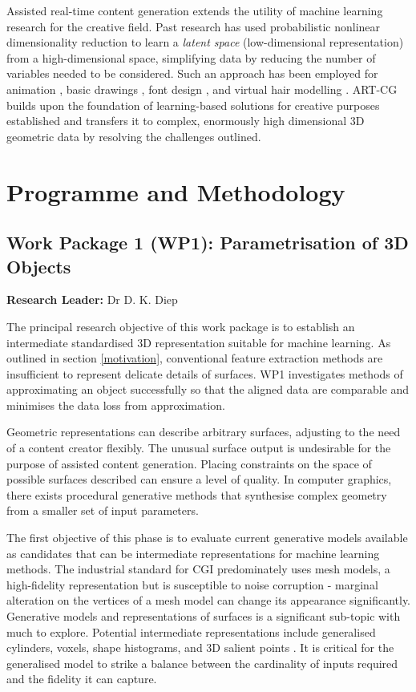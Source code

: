 \documentclass[a4paper, 11pt, onecolumn]{article} %
\numberwithin{equation}{section} %
\numberwithin{figure}{section} %
\numberwithin{table}{section} %
\begin{document}
Assisted real-time content generation extends the utility of machine learning research for the creative field. Past research has used probabilistic nonlinear dimensionality reduction to learn a \textit{latent space} (low-dimensional representation) from a high-dimensional space, simplifying data by reducing the number of variables needed to be considered. Such an approach has been employed for animation \cite{styleik}, basic drawings \cite{latentdoodle}, font design \cite{fontmanifold}, and virtual hair modelling \cite{artcg}. ART-CG builds upon the foundation of learning-based solutions for creative purposes established and transfers it to complex, enormously high dimensional 3D geometric data by resolving the challenges outlined.


\section{Programme and Methodology}
\subsection*{Work Package 1 (WP1): Parametrisation of 3D Objects}
\textbf{Research Leader:} Dr D. K. Diep\par

The principal research objective of this work package is to establish an intermediate standardised 3D representation suitable for machine learning. As outlined in section \ref{motivation}, conventional feature extraction methods are insufficient to represent delicate details of surfaces. WP1 investigates methods of approximating an object successfully so that the aligned data are comparable and minimises the data loss from approximation.

Geometric representations can describe arbitrary surfaces, adjusting to the need of a content creator flexibly. The unusual surface output is undesirable for the purpose of assisted content generation. Placing constraints on the space of possible surfaces described can ensure a level of quality. In computer graphics, there exists procedural generative methods that synthesise complex geometry from a smaller set of input parameters.

The first objective of this phase is to evaluate current generative models available as candidates that can be intermediate representations for machine learning methods. The industrial standard for CGI predominately uses mesh models, a high-fidelity representation but is susceptible to noise corruption - marginal alteration on the vertices of a mesh model can change its appearance significantly. Generative models and representations of surfaces is a significant sub-topic with much to explore. Potential intermediate representations include generalised cylinders, voxels, shape histograms, and 3D salient points \cite{salientpoints}. It is critical for the generalised model to strike a balance between the cardinality of inputs required and the fidelity it can capture.
\end{document}
